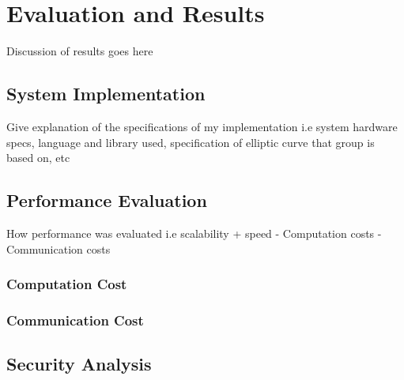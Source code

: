 \chapter{Evaluation and Results}
\label{chap:evaluation_and_results}

Discussion of results goes here

\section{System Implementation}

Give explanation of the specifications of my implementation i.e system hardware specs, language and library used, specification of elliptic curve that group is based on, etc


\section{Performance Evaluation}

How performance was evaluated i.e scalability + speed
- Computation costs
- Communication costs

\subsection*{Computation Cost}


\subsection*{Communication Cost}


\section{Security Analysis}